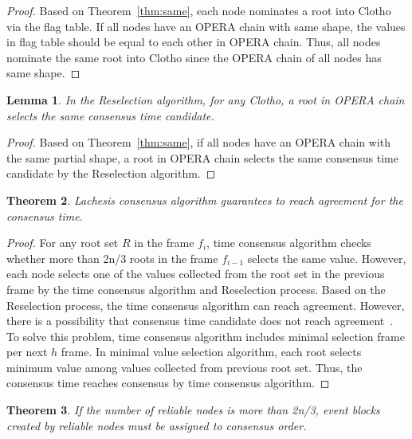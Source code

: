 \documentclass[preprint,12pt]{elsarticle}
\newtheorem{thm}{Theorem}[section]
\newtheorem{lem}[thm]{Lemma}
\begin{document}
\begin{proof}
Based on Theorem~\ref{thm:same}, each node nominates a root into Clotho via the flag table. If all nodes have an OPERA chain with same shape, the values in flag table should be equal to each other in OPERA chain. Thus, all nodes nominate the same root into Clotho since the OPERA chain of all nodes has same shape.
\end{proof}

\begin{lem}
\label{lem:resel}
In the Reselection algorithm, for any Clotho, a root in OPERA chain selects the same consensus time candidate.
\end{lem}

\begin{proof}
Based on Theorem~\ref{thm:same}, if all nodes have an OPERA chain with the same partial shape, a root in OPERA chain selects the same consensus time candidate by the Reselection algorithm.
\end{proof}

\begin{thm}
\label{thm:ct}
Lachesis consensus algorithm guarantees to reach agreement for the consensus time.
\end{thm}

\begin{proof}
For any root set $R$ in the frame $f_{i}$, time consensus algorithm checks whether more than 2n/3 roots in the frame $f_{i-1}$ selects the same value. However, each node selects one of the values collected from the root set in the previous frame by the time consensus algorithm and Reselection process. Based on the Reselection process, the time consensus algorithm can reach agreement. However, there is a possibility that consensus time candidate does not reach agreement~\cite{Fischer85}. To solve this problem, time consensus algorithm includes minimal selection frame per next $h$ frame. In minimal value selection algorithm, each root selects minimum value among values collected from previous root set. Thus, the consensus time reaches consensus by time consensus algorithm.
\end{proof}

\begin{thm}
\label{thm:bft}
If the number of reliable nodes is more than 2n/3, event blocks created by reliable nodes must be assigned to consensus order.
\end{thm}
\end{document}
